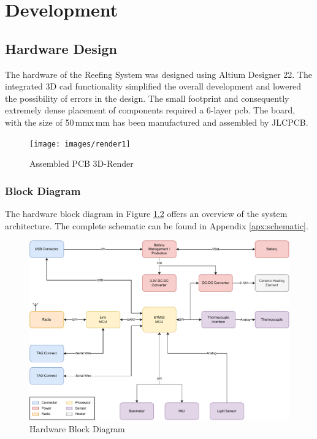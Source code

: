 \chapter{Development}

\section{Hardware Design}
The hardware of the Reefing System was designed using Altium Designer 22. The integrated 3D \acrshort{cad} functionality simplified the overall development and lowered the possibility of errors in the design. The small footprint and consequently extremely dense placement of components required a 6-layer \acrfull{pcb}. The board, with the size of 50\,mm\;x\,mm has been manufactured and assembled by JLCPCB.

\begin{figure}[h!]
	\hspace{-2.2cm}
	\texttt{[image: images/render1]}
	\caption{Assembled PCB 3D-Render}
	\label{fig:rendering-pcb}
\end{figure}
\newpage

\subsection{Block Diagram}
The hardware block diagram in Figure \ref{fig:hardware-block-diagram} offers an overview of the system architecture. The complete schematic can be found in Appendix \ref{apx:schematic}.  

\medskip
\begin{figure}[h!]
	\centering
	\includegraphics[width=\textwidth]{images/block_diagram}
	\vspace{0.1cm}
	\caption{Hardware Block Diagram}
	\label{fig:hardware-block-diagram}
\end{figure}




